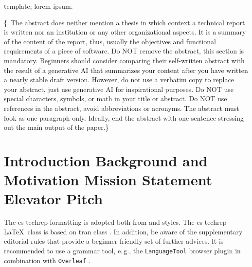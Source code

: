 \documentclass[conference,a4paper,flushend]{cs-techrep}
\begin{document}
\selectlanguage{\cstechrepLang}

\maketitle

\begin{abstract}
This paper demonstrates an example of a technical report in computer science or software engineering, based on the \texttt{cs-techrep} LaTeX class.
The example is intended for beginners, e.\,g., undergraduate students.
It contains a basic outline template and usually fills it with dummy text, but some sections are describing the intent of the outline template and its sections.
Graphic exclamation marks highlight important remarks.
\end{abstract}

\begin{IEEEkeywords}
template; lorem ipsum.
\end{IEEEkeywords}

\{\,\faWarning{} The abstract does neither mention a thesis in which context a technical report is written nor an institution or any other organizational aspects.
It is a summary of the content of the report, thus, usually the objectives and functional requirements of a piece of software.
Do NOT remove the abstract, this section is mandatory.
Beginners should consider comparing their self-written abstract with the result of a generative AI that summarizes your content after you have written a nearly stable draft version. However, do not use a verbatim copy to replace your abstract, just use generative AI for inspirational purposes.
Do NOT use special characters, symbols, or math in your title or abstract.
Do NOT use references in the abstract, avoid abbreviations or acronyms.
The abstract must look as one paragraph only.
Ideally, end the abstract with one sentence stressing out the main output of the paper.\}

\section{Introduction \textbar{} Background and Motivation \textbar{} Mission Statement \textbar{} Elevator Pitch}

The cs-techrep formatting is adopted both from  \cite{ieee2018formattingrules} and  \cite{iaria2014formattingrules} styles.
The cs-techrep \LaTeX\ class is based on tran class \cite{ieee2015howto}.
In addition, be aware of the supplementary  editorial rules \cite{iaria2009editorialrules} \faWarning{} that provide a beginner-friendly set of further advices.
It is recommended to use a grammar tool, e.\,g., the \texttt{LanguageTool} \cite{languagetool} browser plugin in combination with \texttt{Overleaf} \cite{overleaf}.
\end{document}
